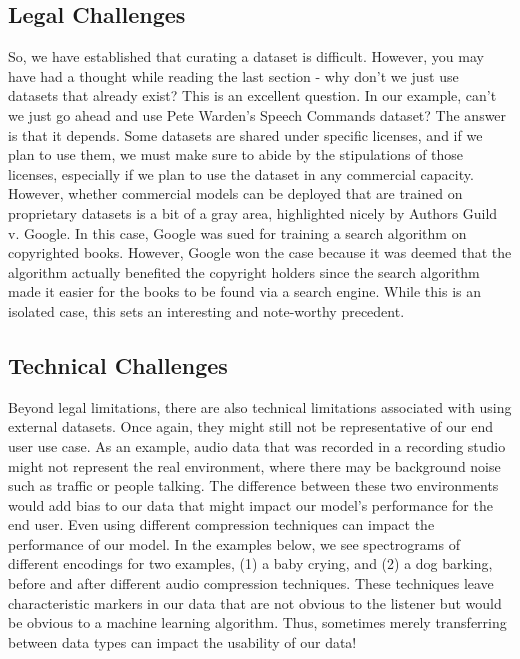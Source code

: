 \subsection{Legal Challenges}

    So, we have established that curating a dataset is difficult. However, you may have had a thought while reading the last section - why don’t we just use datasets that already exist? This is an excellent question. In our example, can’t we just go ahead and use Pete Warden’s Speech Commands dataset? The answer is that it depends. Some datasets are shared under specific licenses, and if we plan to use them, we must make sure to abide by the stipulations of those licenses, especially if we plan to use the dataset in any commercial capacity. However, whether commercial models can be deployed that are trained on proprietary datasets is a bit of a gray area, highlighted nicely by Authors Guild v. Google. In this case, Google was sued for training a search algorithm on copyrighted books. However, Google won the case because it was deemed that the algorithm actually benefited the copyright holders since the search algorithm made it easier for the books to be found via a search engine. While this is an isolated case, this sets an interesting and note-worthy precedent.
    
\subsection{Technical Challenges}

    Beyond legal limitations, there are also technical limitations associated with using external datasets. Once again, they might still not be representative of our end user use case. As an example, audio data that was recorded in a recording studio might not represent the real environment, where there may be background noise such as traffic or people talking. The difference between these two environments would add bias to our data that might impact our model’s performance for the end user. Even using different compression techniques can impact the performance of our model. In the examples below, we see spectrograms of different encodings for two examples, (1) a baby crying, and (2) a dog barking, before and after different audio compression techniques. These techniques leave characteristic markers in our data that are not obvious to the listener but would be obvious to a machine learning algorithm. Thus, sometimes merely transferring between data types can impact the usability of our data!
 

